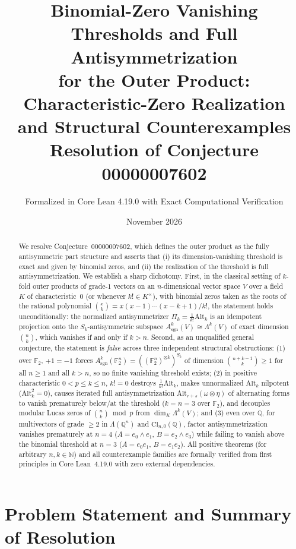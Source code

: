 \documentclass[11pt,a4paper]{article}
\title{\textbf{Binomial-Zero Vanishing Thresholds and Full Antisymmetrization\\for the Outer Product: Characteristic-Zero Realization\\and Structural Counterexamples}\\[6pt]
\large Resolution of Conjecture 00000007602}
\author{Formalized in Core Lean 4.19.0 with Exact Computational Verification}
\date{November 2026}
\theoremstyle{definition}
\theoremstyle{remark}
\newcommand{\Alt}{\mathrm{Alt}}
\newcommand{\Cl}{\mathrm{Cl}}
\newcommand{\sgn}{\mathrm{sgn}}
\newcommand{\F}{\mathbb{F}}
\newcommand{\Q}{\mathbb{Q}}
\newcommand{\N}{\mathbb{N}}
\begin{document}
\maketitle

\begin{abstract}
We resolve Conjecture~00000007602, which defines the outer product as the fully antisymmetric part structure and asserts that (i) its dimension-vanishing threshold is exact and given by binomial zeros, and (ii) the realization of the threshold is full antisymmetrization. We establish a sharp dichotomy. First, in the classical setting of $k$-fold outer products of grade-$1$ vectors on an $n$-dimensional vector space $V$ over a field $K$ of characteristic~$0$ (or whenever $k! \in K^\times$), with binomial zeros taken as the roots of the rational polynomial $\binom{x}{k} = x(x-1)\cdots(x-k+1)/k!$, the statement holds unconditionally: the normalized antisymmetrizer $\Pi_k = \frac{1}{k!}\Alt_k$ is an idempotent projection onto the $S_k$-antisymmetric subspace $A^k_{\sgn}(V) \cong \Lambda^k(V)$ of exact dimension $\binom{n}{k}$, which vanishes if and only if $k > n$. Second, as an unqualified general conjecture, the statement is \emph{false} across three independent structural obstructions: (1) over $\F_2$, $+1 = -1$ forces $A^k_{\sgn}(\F_2^n) = ((\F_2^n)^{\otimes k})^{S_k}$ of dimension $\binom{n+k-1}{k} \ge 1$ for all $n \ge 1$ and all $k > n$, so no finite vanishing threshold exists; (2) in positive characteristic $0 < p \le k \le n$, $k! = 0$ destroys $\frac{1}{k!}\Alt_k$, makes unnormalized $\Alt_k$ nilpotent ($\Alt_k^2 = 0$), causes iterated full antisymmetrization $\Alt_{r+s}(\omega \otimes \eta)$ of alternating forms to vanish prematurely below/at the threshold ($k = n = 3$ over $\F_2$), and decouples modular Lucas zeros of $\binom{n}{k} \bmod p$ from $\dim_K \Lambda^k(V)$; and (3) even over $\Q$, for multivectors of grade $\ge 2$ in $\Lambda(\Q^n)$ and $\Cl_{n,0}(\Q)$, factor antisymmetrization vanishes prematurely at $n = 4$ ($A = e_0 \wedge e_1$, $B = e_2 \wedge e_3$) while failing to vanish above the binomial threshold at $n = 3$ ($A = e_0 e_1$, $B = e_1 e_2$). All positive theorems (for arbitrary $n, k \in \N$) and all counterexample families are formally verified from first principles in Core Lean~4.19.0 with zero external dependencies.
\end{abstract}

\section{Problem Statement and Summary of Resolution}
\end{document}
